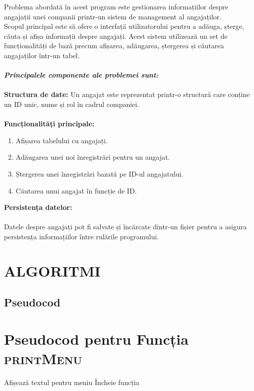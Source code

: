\documentclass[12pt,a4paper]{article}
\begin{document}
Problema abordată în acest program este gestionarea informațiilor despre angajații unei companii printr-un sistem de management al angajaților.\\ Scopul principal este să ofere o interfață utilizatorului pentru a adăuga, șterge, căuta și afișa informații despre angajați. Acest sistem utilizează un set de funcționalități de bază precum afișarea, adăugarea, ștergerea și căutarea angajaților într-un tabel.\\\\
\textbf{\textit{Principalele componente ale problemei sunt:}}\\\\
\textbf{Structura de date:} Un angajat este reprezentat printr-o structură care conține un ID unic, nume și rol în cadrul companiei.\\\\
\textbf{Funcționalități principale:}\\
\begin{enumerate}
    \item Afișarea tabelului cu angajați.
    \item Adăugarea unei noi înregistrări pentru un angajat.
    \item Ștergerea unei înregistrări bazată pe ID-ul angajatului.
    \item Căutarea unui angajat în funcție de ID.
\end{enumerate}
\textbf{Persistența datelor:} \\\\
Datele despre angajați pot fi salvate și încărcate dintr-un fișier pentru a asigura persistența informațiilor între rulările programului.\\

\newpage

\section{ALGORITMI}
\subsection{Pseudocod}

\section*{Pseudocod pentru Funcția \textsc{printMenu}}
\begin{algorithm}
\begin{algorithmic}[1]
    \State Afișează textul pentru meniu
    \State Încheie funcția
\end{algorithmic}
\end{algorithm}
\end{document}
